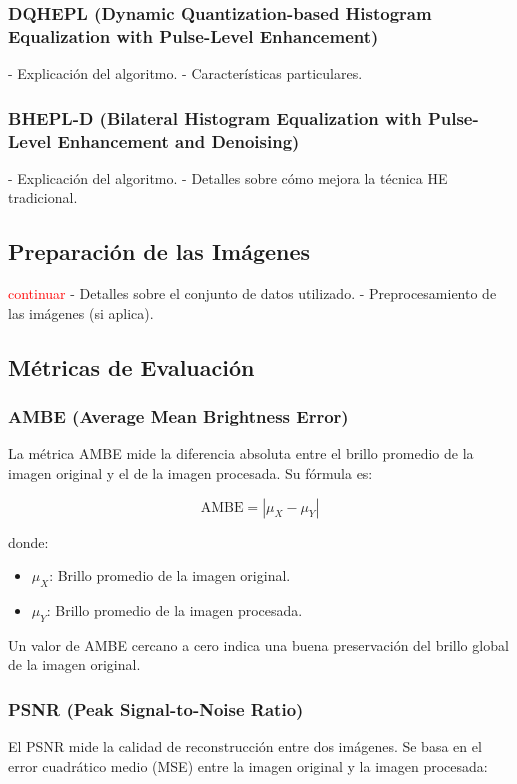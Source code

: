 \documentclass[sigchi]{acmart}
\newcommand{\rojo}[1]{\textcolor{red}{#1}}
\begin{document}
\subsubsection{DQHEPL (Dynamic Quantization-based Histogram Equalization with Pulse-Level Enhancement)}
- Explicación del algoritmo.
- Características particulares.

\subsubsection{BHEPL-D (Bilateral Histogram Equalization with Pulse-Level Enhancement and Denoising)}
- Explicación del algoritmo.
- Detalles sobre cómo mejora la técnica HE tradicional.

\subsection{Preparación de las Imágenes}
\rojo{continuar}
- Detalles sobre el conjunto de datos utilizado.
- Preprocesamiento de las imágenes (si aplica).

\subsection{Métricas de Evaluación}

\subsubsection{AMBE (Average Mean Brightness Error)}
La métrica AMBE mide la diferencia absoluta entre el brillo promedio de la imagen original y el de la imagen procesada. Su fórmula es:

\begin{equation}
\text{AMBE} = \left| \mu_X - \mu_Y \right|
\end{equation}

donde:
\begin{itemize}
    \item $\mu_X$: Brillo promedio de la imagen original.
    \item $\mu_Y$: Brillo promedio de la imagen procesada.
\end{itemize}

Un valor de AMBE cercano a cero indica una buena preservación del brillo global de la imagen original.

\subsubsection{PSNR (Peak Signal-to-Noise Ratio)}
El PSNR mide la calidad de reconstrucción entre dos imágenes. Se basa en el error cuadrático medio (MSE) entre la imagen original y la imagen procesada:
\end{document}
